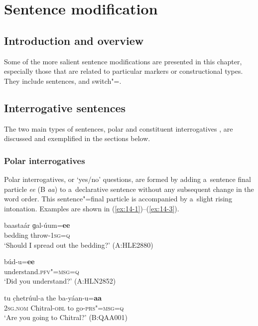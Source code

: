 \chapter{Sentence modification}
\label{chap:14}

\section{Introduction and overview}
\label{sec:14-1}


Some of the more salient sentence modifications are presented in this chapter, especially those that are related to particular markers or constructional types. They include  sentences,  and switch"=.


\section{Interrogative sentences}
\label{sec:14-2}


The two main types of  sentences, polar and constituent interrogatives \citep[290--303]{koenigsiemund2007}, are discussed and exemplified in the sections below. 


\subsection{Polar interrogatives}
\label{subsec:14-2-1}


Polar interrogatives, or `yes/no' questions, are formed by adding a~sentence final particle \textit{ee} (B \textit{aa}) to a~declarative sentence without any subsequent change in the word order. This sentence"=final particle is accompanied by a~slight rising intonation. Examples are shown in (\ref{ex:14-1})--(\ref{ex:14-3}).

\begin{exe}
\ex
\label{ex:14-1}
\gll baastaár ɡal-úum=\textbf{ee}  \\
bedding throw-\textsc{1sg=q} \\
\glt `Should I spread out the bedding?' (A:HLE2880)

\ex
\label{ex:14-2}
\gll búd-u=\textbf{ee} \\
understand.\textsc{pfv"=msg=q} \\
\glt `Did you understand?' (A:HLN2852)

\ex
\label{ex:14-3}
\gll tu c̣hetrúul-a the ba-yáan-u=\textbf{aa} \\
\textsc{2sg.nom} Chitral-\textsc{obl} to go-\textsc{prs"=msg=q} \\
\glt `Are you going to Chitral?' (B:QAA001)
\end{exe}

